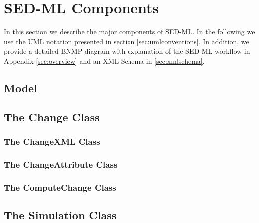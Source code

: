 
\section{SED-ML Components}
In this section we describe the major components of SED-ML. In the following we 
use the UML notation presented in section \ref{sec:umlconventions}. 
In addition, we provide a detailed BNMP diagram with explanation of the SED-ML workflow in Appendix \ref{sec:overview} and an XML Schema in 
\ref{sec:xmlschema}. 

  \subsection{Model}
  

  \subsection[Change]{The Change Class}
  

  \subsubsection[ChangeXML]{The ChangeXML Class}
  

  \subsubsection[ChangeAttribute]{The ChangeAttribute Class}
  

  \subsubsection[ComputeChange]{The ComputeChange Class}
  


 \subsection[Simulation]{The Simulation Class}
 

